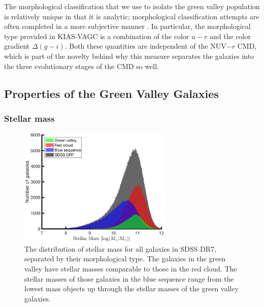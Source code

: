 The morphological classification that we use to isolate the green valley 
population is relatively unique in that it is analytic; morphological 
classification attempts are often completed in a more subjective manner 
\citep[such as the GalaxyZoo,][]{Lintott11}.  In particular, the 
morphological type provided in KIAS-VAGC is a combination of the color $u-r$ and 
the color gradient $\Delta (g-i)$.  Both these quantities are independent of the 
NUV$-r$ CMD, which is part of the novelty behind why this measure separates the 
galaxies into the three evolutionary stages of the CMD so well.


\subsection{Properties of the Green Valley Galaxies}

\subsubsection{Stellar mass}

\begin{figure}
    \includegraphics[width=0.65\textwidth]{Images/GV/Mstar_hist}
    \caption[Stellar mass distribution by morphological type]{The distribution 
    of stellar mass for all galaxies in SDSS DR7, separated by their 
    morphological type.  The galaxies in the green valley have stellar masses 
    comparable to those in the red cloud.  The stellar masses of those galaxies 
    in the blue sequence range from the lowest mass objects up through the 
    stellar masses of the green valley galaxies.}
    \label{fig:M_hist}
\end{figure}

